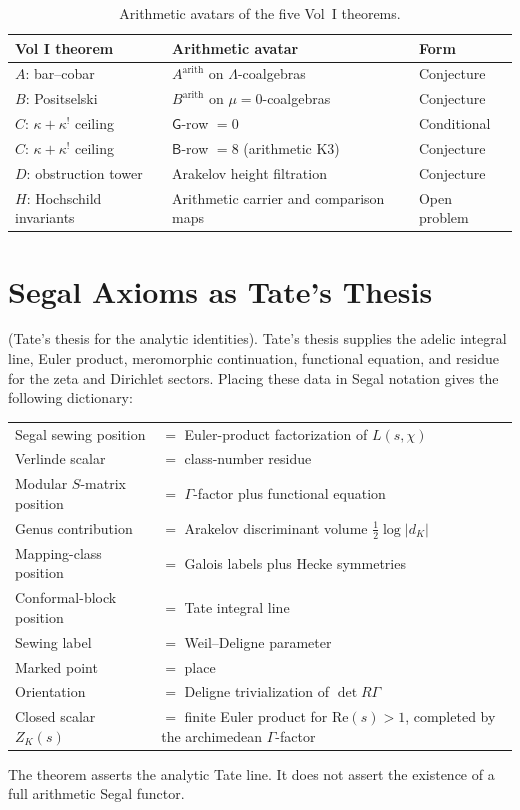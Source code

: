 \begin{table}[h]
\centering
\begin{tabular}{l|l|l}
Vol I theorem & Arithmetic avatar & Form \\
\hline
\(A\): bar--cobar & \(A^{\mathrm{arith}}\) on \(\Lambda\)-coalgebras & Conjecture \\
\(B\): Positselski & \(B^{\mathrm{arith}}\) on \(\mu=0\)-coalgebras & Conjecture \\
\(C\): \(\kappa+\kappa^{!}\) ceiling & \(\mathsf{G}\)-row \(=0\) & Conditional \\
\(C\): \(\kappa+\kappa^{!}\) ceiling & \(\mathsf{B}\)-row \(=8\) (arithmetic K3) & Conjecture \\
\(D\): obstruction tower & Arakelov height filtration & Conjecture \\
\(H\): Hochschild invariants & Arithmetic carrier and comparison maps & Open problem \\
\end{tabular}
\caption{Arithmetic avatars of the five Vol~I theorems.}
\label{v4-arith:table:form}
\end{table}

\section{Segal Axioms as Tate's Thesis}
\label{v4-arith:syn:segal-tate}

\begin{theorem}
\label{v4-arith:thm:segal-tate}
(Tate's thesis for the analytic
identities). Tate's thesis supplies the adelic integral line, Euler
product, meromorphic continuation, functional equation, and residue
for the zeta and Dirichlet sectors. Placing these data in Segal
notation gives the following dictionary:
\begin{center}
\begin{tabular}{ll}
Segal sewing position & \(=\) Euler-product factorization of \(L(s,\chi)\) \\
Verlinde scalar & \(=\) class-number residue \\
Modular \(S\)-matrix position & \(=\) \(\Gamma\)-factor plus functional equation \\
Genus contribution & \(=\) Arakelov discriminant volume \(\tfrac{1}{2}\log|d_{K}|\) \\
Mapping-class position & \(=\) Galois labels plus Hecke symmetries \\
Conformal-block position & \(=\) Tate integral line \\
Sewing label & \(=\) Weil--Deligne parameter \\
Marked point & \(=\) place \\
Orientation & \(=\) Deligne trivialization of \(\det R\Gamma\) \\
Closed scalar \(Z_K(s)\) & \(=\) finite Euler product for
\(\mathrm{Re}(s)>1\), completed by the archimedean \(\Gamma\)-factor
\end{tabular}
\end{center}
The theorem asserts the analytic Tate line.  It does not assert the
existence of a full arithmetic Segal functor.
\end{theorem}

